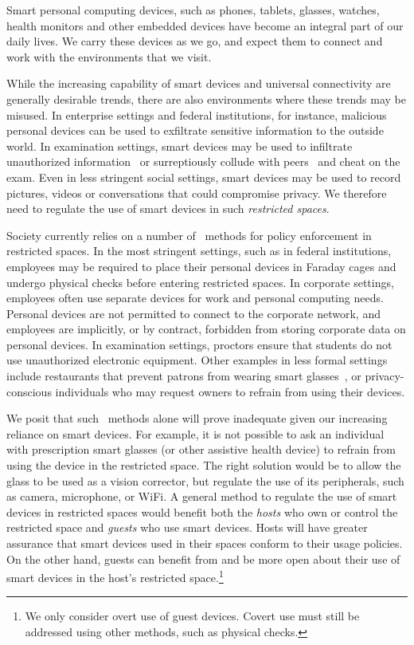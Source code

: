 \label{section:introduction}

Smart personal computing devices, such as phones, tablets, glasses, watches,
health monitors and other embedded devices have become an integral part of our
daily lives. We carry these devices as we go, and expect them to connect and
work with the environments that we visit.

While the increasing capability of smart devices and universal connectivity are
generally desirable trends, there are also environments where these trends may
be misused. In enterprise settings and federal institutions, for instance,
malicious personal devices can be used to exfiltrate sensitive information to
the outside world. In examination settings, smart devices may be used to
infiltrate unauthorized information~\cite{url:examcheating} or surreptiously
collude with peers~\cite{smartwatch:fc14} and cheat on the exam.  Even in less
stringent social settings, smart devices may be used to record pictures, videos
or conversations that could compromise privacy. We therefore need to regulate
the use of smart devices in such \textit{restricted spaces}.

Society currently relies on a number of \adhoc\ methods for policy enforcement
in restricted spaces. In the most stringent settings, such as in federal
institutions, employees may be required to place their personal devices in
Faraday cages and undergo physical checks before entering restricted spaces.
In corporate settings, employees often use separate devices for work and
personal computing needs. Personal devices are not permitted to connect to the
corporate network, and employees are implicitly, or by contract, forbidden from
storing corporate data on personal devices. In examination settings, proctors
ensure that students do not use unauthorized electronic equipment.  Other
examples in less formal settings include restaurants that prevent patrons from
wearing smart glasses~\cite{url:glassban}, or privacy-conscious individuals who
may request owners to refrain from using their devices.

We posit that such \adhoc\ methods alone will prove inadequate given our
increasing reliance on smart devices. For example, it is not possible to ask an
individual with prescription smart glasses (or other assistive health device)
to refrain from using the device in the restricted space. The right solution
would be to allow the glass to be used as a vision corrector, but regulate the
use of its peripherals, such as camera, microphone, or WiFi.  A general method
to regulate the use of smart devices in restricted spaces would benefit both
the \textit{hosts} who own or control the restricted space and \textit{guests}
who use smart devices.  Hosts will have greater assurance that smart devices
used in their spaces conform to their usage policies. On the other hand, guests
can benefit from and be more open about their use of smart devices in the
host's restricted space.\footnote{We only consider overt use of guest devices.
Covert use must still be addressed using other methods, such as physical
checks.}

